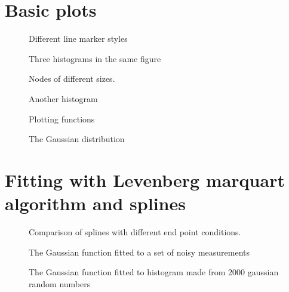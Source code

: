 \documentclass{article}
\begin{document}
\section{Basic plots}
\label{sec:basic}

\begin{figure}[H]
  \centering
  
  \caption{Different line marker styles}
\end{figure}

\begin{figure}[H]
  \centering
  
  \caption{Three histograms in the same figure}
\end{figure}

\begin{figure}[H]
  \centering
  
  \caption{Nodes of different sizes.}
\end{figure}

\begin{figure}[H]
  \centering
  
  \caption{Another histogram}
\end{figure}

\begin{figure}[H]
  \centering
  
  \caption{Plotting functions}
\end{figure}

\begin{figure}[H]
  \centering
  
  \caption{The Gaussian distribution}
\end{figure}

\section{Fitting with Levenberg marquart algorithm and splines}
\label{sec:LMA}

\begin{figure}[H]
  \centering
  
  \caption{Comparison of splines with different end point conditions.}
\end{figure}

\begin{figure}[H]
  \centering
  
  \caption{The Gaussian function fitted to a set of noisy measurements}
\end{figure}

\begin{figure}[H]
  \centering
  
  \caption{The Gaussian function fitted to histogram made from 2000 gaussian random numbers}
\end{figure}
\end{document}
